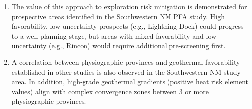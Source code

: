 \begin{enumerate}
    \item The value of this approach to exploration risk mitigation is demonstrated for  prospective areas identified in the Southwestern NM PFA study. High favorability, low uncertainty prospects (e.g., Lightning Dock) could progress to a well-planning stage, but areas with mixed favorability and low uncertainty (e.g., Rincon) would require additional pre-screening first.
    \item A correlation between physiographic provinces and geothermal favorability established in other studies is also observed in the Southwestern NM study area. In addition, high-grade geothermal gradients (positive heat risk element values) align with complex convergence zones between 3 or more physiographic provinces.
\end{enumerate}





